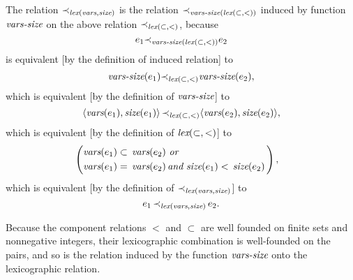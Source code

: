 \documentclass[runningheads]{llncs}
\DeclareMathOperator{\uand}{\emph{and}\,}
\DeclareMathOperator{\uor}{\emph{or}\,}
\DeclareMathOperator{\uiff}{\iff}
\DeclareMathOperator{\lex}{\emph{lex}}
\begin{document}
 The relation $\expsub{\prec}{\lex(\vars,\size)}$ is the relation  $\expsub{\prec}{\varssize(\lex(\subset, <))}$ induced by function 
$\emph{vars-size}$ on the above relation $\expsub{\prec}{\lex(\subset, <)}$, because
\[\e{1}  \expsub{\prec}{\varssize(\lex(\subset, <))} \e{2} \]
is equivalent [by the definition of induced relation] to
\[\varssize(\e{1}) \expsub{\prec}{\lex(\subset, <)} \varssize(\e{2}),\]
which is equivalent [by the definition of $\emph{vars-size}$] to
\[\langle\vars(\e{1}), \size(\e{1})\rangle \, \expsub{\prec}{\lex(\subset, <)} \langle \vars(\e{2}), \size(\e{2})\rangle,\]
which is equivalent [by the definition of $\lex(\subset, <)$] to
\begin{alignat*}{2}
  \begin{split}
  &\left(\begin{aligned}
  &\vars(\e{1}) \subset \, \vars(\e{2})\, \uor \, \\
  &\vars(\e{1}) = \, \vars(\e{2}) \uand
 \size(\e{1}) < \, \size(\e{2})\,
  \end{aligned}\right),
  \end{split}
  \end{alignat*}
 which is equivalent [by the definition of $\expsub{\prec}{\lex(\vars,\size)}$] to
\[\e{1} \, \expsub{\prec}{\lex(\vars,\size)}\, \e{2}.\]
 









\begin{comment}
 $\expsub{\prec}{\lex(\subset, <)}$, is defined by
\begin{alignat*}{2}
  \begin{split}
  &\langle s_{1}, n_{1}\rangle \,  \expsub{\prec}{\lex(\subset, <)}\, \langle s_{2},n_{2} \rangle
  \uiff \\
  &\left(\begin{aligned}
  &\vars(\e{1}) \subset \, \vars(\e{2})\, \uor \, \\
  &\vars(\e{1}) = \, \vars(\e{2}) \uand
 \size(\e{1}) < \, \size(\e{2})\,
  \end{aligned}\right).
  \end{split}
  \end{alignat*}
 which is the lexicographic combination of the proper-subset relation $\subset$ on the finite sets and the less-than relation $<$ on the nonnegative integers.
 \end{comment}

Because the component relations $<$ and $\subset$ are well founded on finite sets and nonnegative integers, their lexicographic combination is well-founded on the pairs, and so is the relation induced by the function $\emph{vars-size}$ onto the lexicographic relation.
\end{document}
